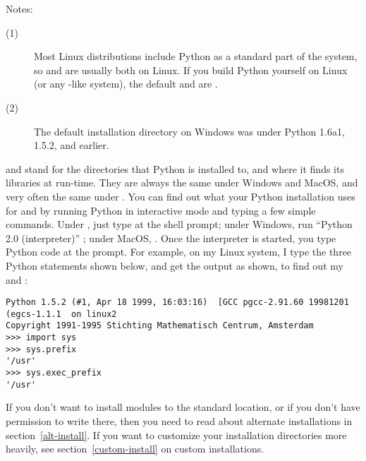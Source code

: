 \documentclass{howto}
\begin{document}
\noindent Notes:
\begin{description}
\item[(1)] Most Linux distributions include Python as a standard part of
  the system, so  and  are usually
  both  on Linux.  If you build Python yourself on Linux (or
  any \UNIX-like system), the default  and
   are .
\item[(2)] The default installation directory on Windows was
   under
  Python 1.6a1, 1.5.2, and earlier.
\end{description}

 and  stand for the directories
that Python is installed to, and where it finds its libraries at
run-time.  They are always the same under Windows and MacOS, and very
often the same under \UNIX.  You can find out what your Python
installation uses for  and  by
running Python in interactive mode and typing a few simple commands.
Under \UNIX, just type  at the shell prompt; under Windows,
run ``Python 2.0 (interpreter)'' ; under MacOS, .
Once the interpreter is started, you type Python code at the
\samp{>>> } prompt.  For example, on my Linux system, I type the three
Python statements shown below, and get the output as shown, to find
out my  and :

\begin{verbatim}
Python 1.5.2 (#1, Apr 18 1999, 16:03:16)  [GCC pgcc-2.91.60 19981201 (egcs-1.1.1  on linux2
Copyright 1991-1995 Stichting Mathematisch Centrum, Amsterdam
>>> import sys
>>> sys.prefix
'/usr'
>>> sys.exec_prefix
'/usr'
\end{verbatim}

If you don't want to install modules to the standard location, or if you
don't have permission to write there, then you need to read about
alternate installations in section~\ref{alt-install}.  If you want to
customize your installation directories more heavily, see
section~\ref{custom-install} on custom installations.


\end{document}
